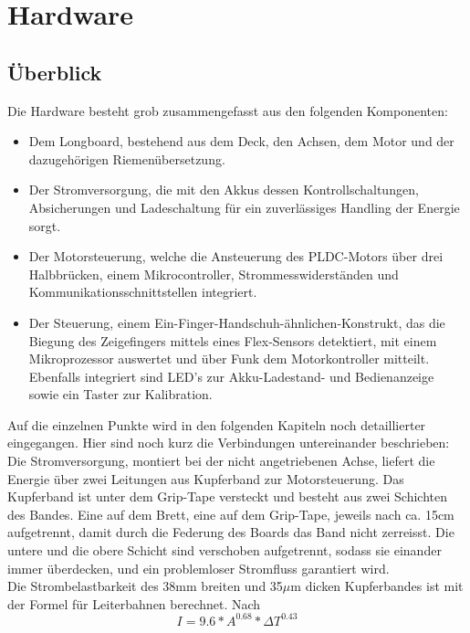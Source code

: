 \chapter{Hardware}
\label{Hardware}

\section{Überblick}
\label{HWUeberblick}
Die Hardware besteht grob zusammengefasst aus den folgenden Komponenten:
\begin{itemize}
	\item Dem Longboard, bestehend aus dem Deck, den Achsen, dem Motor und der dazugehörigen Riemenübersetzung.
	\item Der Stromversorgung, die mit den Akkus dessen Kontrollschaltungen, Absicherungen und Ladeschaltung für ein zuverlässiges Handling der Energie sorgt.
	\item Der Motorsteuerung, welche die Ansteuerung des PLDC-Motors über drei Halbbrücken, einem Mikrocontroller, Strommesswiderständen und Kommunikationsschnittstellen integriert.
	\item Der Steuerung, einem Ein-Finger-Handschuh-ähnlichen-Konstrukt, das die Biegung des Zeigefingers mittels eines Flex-Sensors detektiert, mit einem Mikroprozessor auswertet und über Funk dem Motorkontroller mitteilt. Ebenfalls integriert sind LED’s zur Akku-Ladestand- und Bedienanzeige sowie ein Taster zur Kalibration.
\end{itemize}
Auf die einzelnen Punkte wird in den folgenden Kapiteln noch detaillierter eingegangen. Hier sind noch kurz die Verbindungen untereinander beschrieben:
\\
Die Stromversorgung, montiert bei der nicht angetriebenen Achse, liefert die Energie über zwei Leitungen aus Kupferband zur Motorsteuerung. Das Kupferband ist unter dem Grip-Tape versteckt und besteht aus zwei Schichten des Bandes. Eine auf dem Brett, eine auf dem Grip-Tape, jeweils nach ca. 15cm aufgetrennt, damit durch die Federung des Boards das Band nicht zerreisst. Die untere und die obere Schicht sind verschoben aufgetrennt, sodass sie einander immer überdecken, und ein problemloser Stromfluss garantiert wird.
\\
Die Strombelastbarkeit des 38mm breiten und 35$\mu$m dicken Kupferbandes ist mit der Formel für Leiterbahnen berechnet.
Nach
\begin{equation}\label{FormelStrombelastbarkeit}
I = 9.6 * A^{0.68} * \Delta T ^{0.43}
\end{equation}
